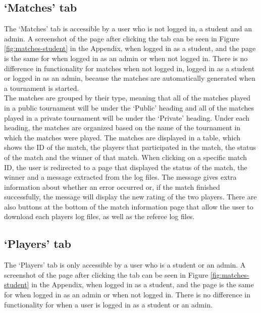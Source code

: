 \documentclass[a4paper, 11pt]{report}
\begin{document}
\subsection{`Matches' tab}
\label{sec:impl-tab-matches}

The `Matches' tab is accessible by a user who is not logged in, a student
and an admin. A screenshot of the page after clicking the tab can be seen in
Figure \ref{fig:matches-student} in the Appendix, when logged in as a student,
and the page is the same for when logged in as an admin or when not logged in.
There is no difference in functionality for matches when not logged in,
logged in as a student or logged in as an admin, because the matches are
automatically generated when a tournament is started. \\

The matches are grouped by their type, meaning that all of the matches played in
a public tournament will be under the `Public' heading and all of the matches
played in a private tournament will be under the `Private' heading. Under each
heading, the matches are organized based on the name of the tournament in which
the matches were played. The matches are displayed in a table, which shows the
ID of the match, the players that participated in the match, the status of the
match and the winner of that match. When clicking on a specific match ID, the user
is redirected to a page that displayed the status of the match, the winner and a
message extracted from the log files. The message gives extra information about
whether an error occurred or, if the match finished successfully, the message will
display the new rating of the two players. There are also buttons at the bottom
of the match information page that allow the user to download each players log
files, as well as the referee log files.

\subsection{`Players' tab}
\label{sec:impl-tab-players}

The `Players' tab is only accessible by a user who is a student or an admin. A
screenshot of the page after clicking the tab can be seen in Figure
\ref{fig:matches-student} in the Appendix, when logged in as a student, and the
page is the same for when logged in as an admin or when not logged in. There is
no difference in functionality for when a user is logged in as a student or an
admin. \\
\end{document}
